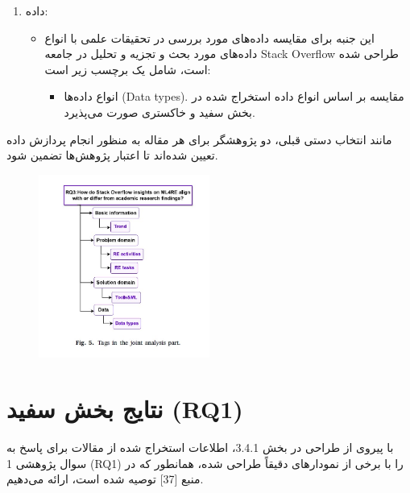 \documentclass[a4paper,10pt]{article}
\begin{document}
\begin{enumerate}
                    \item داده:
                    \begin{itemize}
                        \item این جنبه برای مقایسه داده‌های مورد بررسی در تحقیقات علمی با انواع داده‌های مورد بحث و تجزیه و تحلیل در جامعه Stack Overflow طراحی شده است، شامل یک برچسب زیر است:
                        \begin{itemize}
                            \item انواع داده‌ها (Data types). مقایسه بر اساس انواع داده استخراج شده در بخش سفید و خاکستری صورت می‌پذیرد.
                        \end{itemize}
                    \end{itemize}
                \end{enumerate}
                

                مانند انتخاب دستی قبلی، دو پژوهشگر برای هر مقاله به منظور انجام پردازش داده تعیین شده‌اند تا اعتبار پژوهش‌ها تضمین شود.

                \begin{figure}
                    \centering
                    \includegraphics[width=0.5\textwidth]{Image/fig-5.jpg}
                \end{figure}
            

    \section{نتایج بخش سفید (RQ1)}

        با پیروی از طراحی در بخش 3.4.1، اطلاعات استخراج شده از مقالات برای پاسخ به سوال پژوهشی 1 (RQ1) را با برخی از نمودارهای دقیقاً طراحی شده، همانطور که در منبع [37] توصیه شده است، ارائه می‌دهیم.
\end{document}
